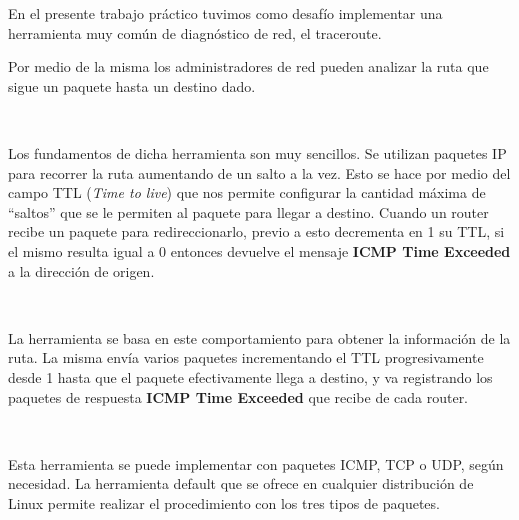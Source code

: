 En el presente trabajo práctico tuvimos como desafío implementar una herramienta muy común de diagnóstico de red, el traceroute.

Por medio de la misma los administradores de red pueden analizar la ruta que sigue un paquete hasta un destino dado.

~

Los fundamentos de dicha herramienta son muy sencillos. Se utilizan paquetes IP para recorrer la ruta aumentando de un salto a la vez. Esto se hace por medio del campo TTL (\textit{Time to live}) que nos permite configurar la cantidad máxima de ``saltos'' que se le permiten al paquete para llegar a destino. Cuando un router recibe un paquete para redireccionarlo, previo a esto decrementa en 1 su TTL, si el mismo resulta igual a 0 entonces devuelve el mensaje \textbf{ICMP Time Exceeded} a la dirección de origen.

~

La herramienta se basa en este comportamiento para obtener la información de la ruta. La misma envía varios paquetes incrementando el TTL progresivamente desde 1 hasta que el paquete efectivamente llega a destino, y va registrando los paquetes de respuesta \textbf{ICMP Time Exceeded} que recibe de cada router.

~

Esta herramienta se puede implementar con paquetes ICMP, TCP o UDP, según necesidad. La herramienta default que se ofrece en cualquier distribución de Linux permite realizar el procedimiento con los tres tipos de paquetes.
